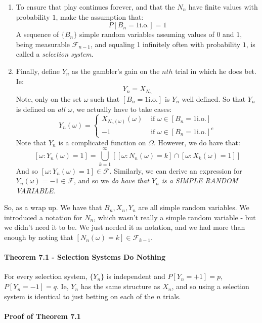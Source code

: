 \documentclass[12pt,a4paper]{article}
\newcommand{\1}[1]{\mathbbm{1}\left\{ #1 \right\}}
\newcommand{\fcal}{\mathcal{F}}
\newcommand{\io}{\text{i.o.}}
\begin{document}
\begin{enumerate}
	\item To ensure that play continues forever, and that the $N_n$ have finite values with probability $1$, make the assumption that:
	$$
		P[B_n = 1 \io] = 1
	$$
	A sequence of $\{B_n\}$ simple random variables assuming values of $0$ and $1$, being measurable $\fcal_{n-1}$, and equaling 1 infinitely often with probability $1$, is called a \textit{selection system}.
	
	\item Finally, define $Y_n$ as the gambler's gain on the $nth$ trial in which he does bet. Ie:
	$$
		Y_n = X_{N_n}
	$$
	Note, only on the set $\omega$ such that $[B_n = 1 \io]$ is $Y_n$ well defined. So that $Y_n$ is defined on \textit{all $\omega$}, we actually have to take cases:
	$$
		Y_n(\omega) = \begin{cases}
		X_{N_n(\omega)}(\omega) & \text{ if $\omega \in [B_n = 1\io]$}\\
		-1 & \text{ if $\omega \in [B_n = 1 \io]^c$}
		\end{cases}
	$$
	Note that $Y_n$ is a complicated function on $\Omega$. However, we do have that:
	$$
		\left[\omega : Y_n(\omega) = 1\right] = 
		\bigcup_{k=1}^\infty \left[\left[\omega: N_n(\omega) = k\right] \cap \left[\omega: X_k(\omega) = 1\right]\right]
	$$
	And so $\left[\omega : Y_n(\omega) = 1\right] \in \fcal$. Similarly, we can derive an expression for $Y_n(\omega) = -1 \in \fcal$, and so we \textit{do have that $Y_n$ is a SIMPLE RANDOM VARIABLE}.
\end{enumerate}
So, as a wrap up. We have that $B_n, X_n, Y_n$ are all simple random variables. We introduced a notation for $N_n$, which wasn't really a simple random variable - but we didn't need it to be. We just needed it as notation, and we had more than enough by noting that $[N_n(\omega) = k] \in \fcal_{k-1}$. 

\paragraph{Theorem 7.1 - Selection Systems Do Nothing} For every selection system, $\{Y_n\}$ is independent and $P[Y_n = +1] = p$, $P[Y_n = -1] = q$. Ie, $Y_n$ has the same structure as $X_n$, and so using a selection system is identical to just betting on each of the $n$ trials.

\paragraph{Proof of Theorem 7.1} 
\end{document}
